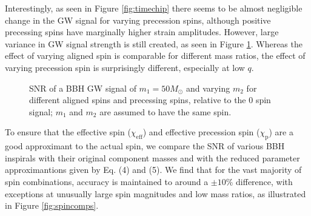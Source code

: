 \documentclass{article}
\begin{document}
Interestingly, as seen in Figure \ref{fig:timechip} there seems to be almost negligible change in the GW signal for varying precession spins, although positive precessing spins have marginally higher strain amplitudes. However, large variance in GW signal strength is still created, as seen in Figure \ref{fig:relsnr}. Whereas the effect of varying aligned spin is comparable for different mass ratios, the effect of varying precession spin is surprisingly different, especially at low $q$. \\

\begin{figure}[!htb]
    \caption{\label{fig:relsnr} SNR of a BBH GW signal of $m_1 = 50 M_\odot$ and varying $m_2$ for different aligned spins and precessing spins, relative to the $0$ spin signal; $m_1$ and $m_2$ are assumed to have the same spin.}
\end{figure}

To ensure that the effective spin ($\chi_\text{eff}$) and effective precession spin ($\chi_\text{p}$) are a good approximant to the actual spin, we compare the SNR of various BBH inspirals with their original component masses and with the reduced parameter approximantions given by Eq. (4) and (5). We find that for the vast majority of spin combinations, accuracy is maintained to around a $\pm 10\%$ difference, with exceptions at unusually large spin magnitudes and low mass ratios, as illustrated in Figure \ref{fig:spincomps}. \\
\end{document}
